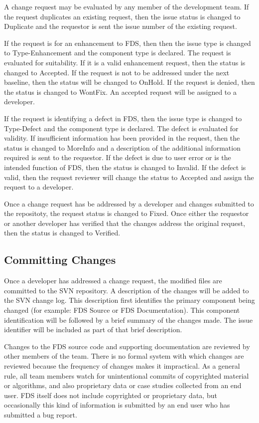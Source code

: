 \documentclass[11pt]{book}
\begin{document}
A change request may be evaluated by any member of the development team.
If the request duplicates an existing request, then the issue status is changed to {\ct Duplicate} and the
requestor is sent the issue number of the existing request.

If the request is for an enhancement to FDS, then then the issue type is changed to {\ct Type-Enhancement} and the
component type is declared. The request is evaluated for suitability.  If it is a valid enhancement
request, then the status is changed to {\ct Accepted}.  If the request is not to
be addressed under the next baseline, then the status will be changed to {\ct OnHold}.  If the request is denied, then
the status is changed to {\ct WontFix}.  An accepted request will be assigned to a developer.

If the request is identifying a defect in FDS, then the issue type is changed to {\ct Type-Defect} and the
component type is declared.  The defect is evaluated for validity.  If insufficient information has
been provided in the request, then the status is changed to {\ct MoreInfo} and a description of the additional
information required is sent to the requestor.  If the defect is due to user error or is the intended function of FDS,
then the status is changed to {\ct Invalid}.  If the defect is valid, then the request reviewer will change the
status to {\ct Accepted} and assign the request to a developer.

Once a change request has be addressed by a developer and changes submitted to the repositoty, the request status
is changed to {\ct Fixed}.  Once either the requestor or another developer has verified that the changes address
the original request, then the status is changed to {\ct Verified}.


\subsection{Committing Changes}

Once a developer has addressed a change request, the modified files are committed to the SVN repository.  A description
of the changes will be added to the SVN change log.  This description first identifies the primary component being
changed (for example: FDS Source or FDS Documentation).  This component identification will be followed by a brief
summary of the changes made.  The issue identifier will be included as part of that brief description.

Changes to the FDS source code and supporting documentation are reviewed by other members of the team. There is no formal system with which changes are reviewed because the frequency of changes makes it impractical. As a general rule, all team members watch for unintentional commits of copyrighted material or algorithms, and also proprietary data or case studies collected from an end user. FDS itself does not include copyrighted or proprietary data, but occasionally this kind of information is submitted by an end user who has submitted a bug report.
\end{document}
